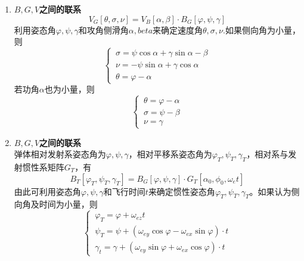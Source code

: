 \begin{enumerate}
	\item \textbf{$B,G,V$之间的联系}
	\begin{equation}
		V_G[\theta, \sigma, \nu] = V_B [\alpha, \beta] \cdot B_G [\varphi, \psi, \gamma]
	\end{equation}
	利用姿态角$\varphi, \psi ,\gamma$和攻角侧滑角$\alpha, beta$来确定速度角$\theta, \sigma , \nu$.如果侧向角为小量，则
	\begin{equation}
		\begin{cases}
			\, \sigma= \psi \cos \alpha + \gamma \sin \alpha - \beta \\
			\, \nu = - \psi \sin \alpha + \gamma \cos \alpha \\
			\, \theta = \varphi - \alpha
		\end{cases}
	\end{equation}
	若功角$\alpha$也为小量，则
	\begin{equation}
		\begin{cases}
			\, \theta= \varphi - \alpha \\
			\, \sigma = \psi - \beta \\
			\, \nu = \gamma
		\end{cases}
	\end{equation}

\item \textbf{$B,G,V$之间的联系}\\
	\hspace*{2em}弹体相对发射系姿态角为$\varphi, \psi, \gamma$，相对平移系姿态角为$\varphi_T, \psi_T, \gamma_T$，相对系与发射惯性系矩阵$G_T$，有
	\begin{equation}
		B_T[\varphi_T, \psi_T, \gamma_T] = B_G [\varphi, \psi, \gamma] \cdot G_T[\alpha_0, \phi_0, \omega_e t]
	\end{equation}
	由此可利用姿态角$\varphi,\psi, \gamma $和飞行时间$t$来确定惯性姿态角$\varphi_T, \psi_T, \gamma_T$。如果认为侧向角及时间为小量，则
	\begin{equation}
		\begin{cases}
			\, \varphi_T = \varphi + \omega_{ez}t\\
			\, \psi_T = \psi + (\omega_{ey}\cos \varphi - \omega_{ex}\sin \varphi)\cdot t\\
			\, \gamma_t = \gamma + (\omega_{ey} \sin \varphi + \omega_{ex}\cos \varphi)\cdot t
		\end{cases}
	\end{equation}

\end{enumerate}

